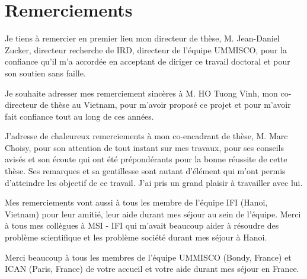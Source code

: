 \chapter*{Remerciements}

Je tiens à remercier en premier lieu mon directeur de thèse, M. Jean-Daniel Zucker, directeur recherche de IRD, directeur de l'équipe UMMISCO, pour la confiance qu'il m'a accordée en acceptant de diriger ce travail doctoral et pour son soutien sans faille. 

%
Je souhaite adresser mes remerciement sincères à M. HO Tuong Vinh, mon co-directeur de thèse au Vietnam, pour m'avoir proposé ce projet et pour m'avoir fait confiance tout au long de ces années. 

%
J'adresse de chaleureux remerciements à mon co-encadrant de thèse, M. Marc Choisy,  pour son attention de tout instant sur mes travaux, pour ses conseils avisés et son écoute qui ont été prépondérants pour la bonne réussite de cette thèse. Ses remarques et sa gentillesse sont autant d'élément qui m'ont permis d'atteindre les objectif de ce travail. J'ai pris un grand plaisir à travailler avec lui.


Mes remerciements vont aussi à tous les membre de l'équipe IFI (Hanoi, Vietnam) pour leur amitié, leur aide durant mes séjour au sein de l'équipe. Merci à tous mes collègues à MSI - IFI qui m'avait beaucoup aider à résoudre des problème scientifique et les problème société durant mes séjour à Hanoi.

Merci beaucoup à tous les membres de l'équipe UMMISCO (Bondy, France) et ICAN (Paris, France) de votre accueil et votre aide durant mes séjour en France.

